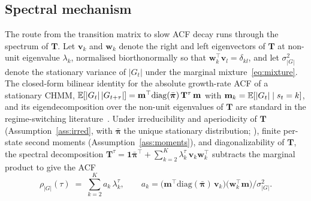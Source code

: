 \subsection{Spectral mechanism}

The route from the transition matrix to slow ACF decay runs through the spectrum of $\mathbf T$. Let $\mathbf v_k$ and $\mathbf w_k$ denote the right and left eigenvectors of $\mathbf T$ at non-unit eigenvalue $\lambda_k$, normalised biorthonormally so that $\mathbf w_k^\top \mathbf v_l = \delta_{kl}$, and let $\sigma_{|G|}^2$ denote the stationary variance of $|G_t|$ under the marginal mixture~\eqref{eq:mixture}. The closed-form bilinear identity for the absolute growth-rate ACF of a stationary CHMM, $\mathbb{E}[|G_t|\,|G_{t+\tau}|] = \mathbf m^\top \mathrm{diag}(\bar{\boldsymbol\pi})\,\mathbf T^\tau\,\mathbf m$ with $\mathbf m_k = \mathbb{E}[|G_t| \mid s_t = k]$, and its eigendecomposition over the non-unit eigenvalues of $\mathbf T$ are standard in the regime-switching literature~\cite{hamilton1994time,krolzig1997markov,timmermann2000moments}. Under irreducibility and aperiodicity of $\mathbf T$ (Assumption~\ref{ass:irred}, with $\bar{\boldsymbol\pi}$ the unique stationary distribution; \citealp{levinperes2017markov}), finite per-state second moments (Assumption~\ref{ass:moments}), and diagonalizability of $\mathbf T$, the spectral decomposition $\mathbf T^\tau = \mathbf 1\bar{\boldsymbol\pi}^\top + \sum_{k=2}^K \lambda_k^\tau\, \mathbf v_k \mathbf w_k^\top$ subtracts the marginal product to give the ACF
\begin{equation}
    \rho_{|G|}(\tau) \;=\; \sum_{k=2}^{K} a_k\, \lambda_k^{\tau},
    \qquad
    a_k = \big(\mathbf m^\top \mathrm{diag}(\bar{\boldsymbol\pi})\, \mathbf v_k\big)\big(\mathbf w_k^\top \mathbf m\big) / \sigma_{|G|}^2.
    \label{eq:acf_normalised}
\end{equation}
